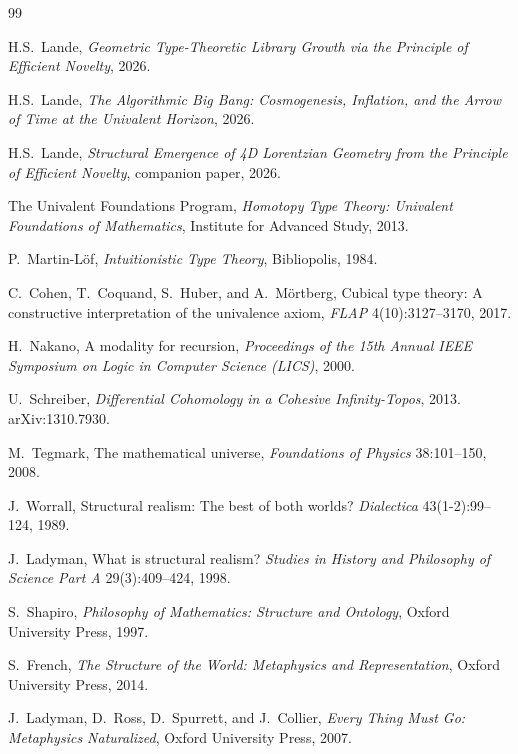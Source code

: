 \documentclass[11pt,a4paper]{article}
\theoremstyle{plain}
\theoremstyle{definition}
\theoremstyle{remark}
\begin{document}
\begin{thebibliography}{99}

H.S.\ Lande,
\emph{Geometric Type-Theoretic Library Growth via the Principle of Efficient Novelty},
2026.

H.S.\ Lande,
\emph{The Algorithmic Big Bang: Cosmogenesis, Inflation, and the Arrow of Time at the Univalent Horizon},
2026.

H.S.\ Lande,
\emph{Structural Emergence of 4D Lorentzian Geometry from the Principle of Efficient Novelty},
companion paper, 2026.

The Univalent Foundations Program,
\emph{Homotopy Type Theory: Univalent Foundations of Mathematics},
Institute for Advanced Study, 2013.

P.\ Martin-L\"{o}f,
\emph{Intuitionistic Type Theory},
Bibliopolis, 1984.

C.\ Cohen, T.\ Coquand, S.\ Huber, and A.\ M\"{o}rtberg,
Cubical type theory: A constructive interpretation of the univalence axiom,
\emph{FLAP} 4(10):3127--3170, 2017.

H.\ Nakano,
A modality for recursion,
\emph{Proceedings of the 15th Annual IEEE Symposium on Logic in Computer Science (LICS)}, 2000.

U.\ Schreiber,
\emph{Differential Cohomology in a Cohesive Infinity-Topos},
2013.
arXiv:1310.7930.

M.\ Tegmark,
The mathematical universe,
\emph{Foundations of Physics} 38:101--150, 2008.

J.\ Worrall,
Structural realism: The best of both worlds?
\emph{Dialectica} 43(1-2):99--124, 1989.

J.\ Ladyman,
What is structural realism?
\emph{Studies in History and Philosophy of Science Part A} 29(3):409--424, 1998.

S.\ Shapiro,
\emph{Philosophy of Mathematics: Structure and Ontology},
Oxford University Press, 1997.

S.\ French,
\emph{The Structure of the World: Metaphysics and Representation},
Oxford University Press, 2014.

J.\ Ladyman, D.\ Ross, D.\ Spurrett, and J.\ Collier,
\emph{Every Thing Must Go: Metaphysics Naturalized},
Oxford University Press, 2007.


\end{thebibliography}
\end{document}
